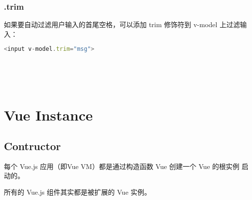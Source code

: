 \subsection{.trim}

如果要自动过滤用户输入的首尾空格，可以添加 trim 修饰符到 v-model 上过滤输入：

\begin{lstlisting}[language=JavaScript]
<input v-model.trim="msg">
\end{lstlisting}





\begin{lstlisting}[language=JavaScript]

\end{lstlisting}




\begin{lstlisting}[language=JavaScript]

\end{lstlisting}





\begin{lstlisting}[language=JavaScript]

\end{lstlisting}




\begin{lstlisting}[language=JavaScript]

\end{lstlisting}





\begin{lstlisting}[language=JavaScript]

\end{lstlisting}


\chapter{Vue Instance}

\section{Contructor}

每个 Vue.js 应用（即Vue VM）都是通过构造函数 Vue 创建一个 Vue 的根实例 启动的。

所有的 Vue.js 组件其实都是被扩展的 Vue 实例。



